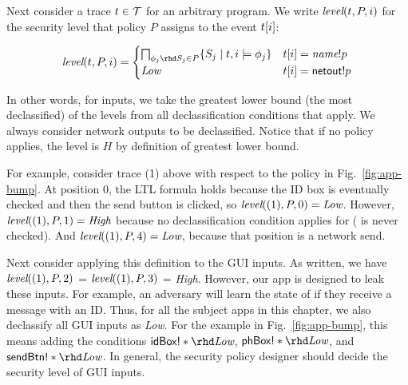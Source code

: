 

Next consider a trace $t \in \mathcal{T}$ for an arbitrary program.
We write $\textit{level}(t, P, i)$ for the security level that policy
$P$ assigns to the event $t[i]$:

\begin{displaymath}
  \tlevel{\tr}{P}{i} =
  \begin{cases}
    \bigsqcap_{\phi_j\rhd S_j \in P} \aset{ S_j \mid \tr, i \models
      \phi_j } & \tr[i] = \sch!p \\
    \textit{Low} & \tr[i] = \code{netout}!p \\
  \end{cases}
\end{displaymath}

In other words, for inputs, we take the greatest lower bound (the most
declassified) of the levels from all declassification conditions that
apply. We always consider network outputs to be
declassified. Notice that if no policy applies, the level is $H$ by
definition of greatest lower bound.

For example, consider trace (1) above with
respect to the policy in Fig.~\ref{fig:app-bump}.  At position 0, the
LTL formula holds because the ID box is eventually checked and then
the send button is clicked, so $\textit{level}((1), P, 0) =
\textit{Low}$. However,
$\textit{level}((1), P, 1) = \textit{High}$ because no
declassification condition applies for 
( is never checked). And $\textit{level}((1), P, 4) =
\textit{Low}$, because that position is a network send.

Next consider applying this definition to the GUI inputs. As written,
we have $\textit{level}((1), P, 2)$ = $\textit{level}((1), P, 3)$ =
\textit{High}. However, our app is designed to leak these inputs. 
For example, an adversary will learn the state of
 if they receive a message with an ID. Thus,
for all the subject apps in this chapter, we also declassify all GUI inputs as
\textit{Low}. 
For the example in Fig.~\ref{fig:app-bump}, this means
adding the conditions
$\code{idBox!}\ast \rhd \textit{Low}$,
$\code{phBox!}\ast \rhd \textit{Low}$, and
$\code{sendBtn!}\ast \rhd \textit{Low}$. In general, 
the security policy designer should decide the security level of GUI inputs.

